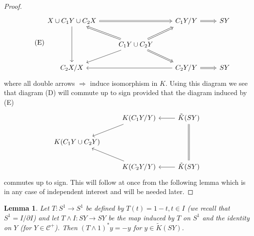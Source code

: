 \documentclass[leqno]{book}
\numberwithin{equation}{section}
\newtheorem{lemma}[theorem]{Lemma}
\theoremstyle{definition}
\begin{document}
\begin{proof}
              \begin{equation*}
                \tag{E}
                \begin{tikzcd}
                  X\cup C_1 Y\cup C_2 X \arrow[dd] \arrow[rr, Rightarrow] &                                                                                                  & C_1 Y/Y \arrow[r, Rightarrow]            & SY \\
                                                                          & C_1 Y \cup C_2 Y \arrow[ld] \arrow[lu, Rightarrow] \arrow[rd, Rightarrow] \arrow[ru, Rightarrow] &                                          &    \\
                  C_2 X/X                                                 &                                                                                                  & C_2 Y/Y \arrow[ll] \arrow[r, Rightarrow] & SY
                \end{tikzcd}
              \end{equation*}
              where all double arrows $\Rightarrow$ induce isomorphism in $K$. Using this diagram we see that diagram (D) will commute up to sign provided that the diagram induced by (E)
              \begin{equation*}
                \begin{tikzcd}
                  & K(C_1 Y/Y) \arrow[ld] & \tilde{K}(SY) \arrow[dd, equal] \arrow[l] \\
                  K(C_1 Y \cup C_2 Y) &                       &                                                         \\
                  & K(C_2 Y/Y) \arrow[lu] & \tilde{K}(SY) \arrow[l]                                
                \end{tikzcd}
              \end{equation*}
              commutes up to sign. This will follow at once from the following lemma which is in any case of independent interest and will be needed later.
            \end{proof}

            \begin{lemma}
              Let $T:S^1\to S^1$ be defined by $T(t)=1-t , t\in I$ (we recall that $S^{1}=I/\partial I$) and let $T\wedge I:SY\to SY$ be the map induced by $T$ on $S^1$ and the identity on $Y$ (for $Y\in \mathcal{C}^{+}$). Then $(T\wedge 1)^{*}y=-y$ for $y \in \tilde{K}(SY)$.
            \end{lemma}
\end{document}
